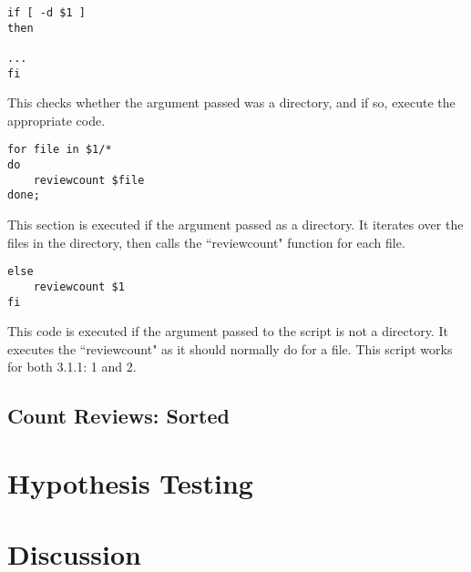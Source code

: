 \documentclass[12pt,a4paper]{article}
\begin{document}
\begin{lstlisting}
if [ -d $1 ]
then

...
fi
\end{lstlisting}
This checks whether the argument passed was a directory, and if so, execute the appropriate code.

\begin{lstlisting}
for file in $1/*
do
	reviewcount $file
done;
\end{lstlisting}
This section is executed if the argument passed as a directory.
It iterates over the files in the directory, then calls the ``reviewcount" function for each file.

\begin{lstlisting}
else
	reviewcount $1
fi
\end{lstlisting}
This code is executed if the argument passed to the script is not a directory.
It executes the ``reviewcount" as it should normally do for a file. \newline \newline
This script works for both 3.1.1: 1 and 2.

\subsection{Count Reviews: Sorted}


\section{Hypothesis Testing}

\section{Discussion}
\end{document}
